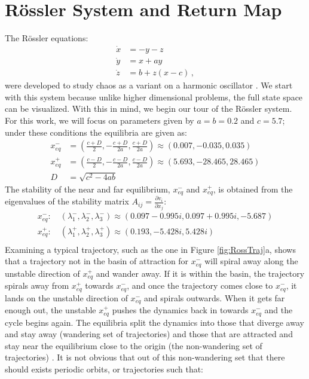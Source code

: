 \documentclass[12 pt]{article}
\begin{document}
\section{R\"ossler System and Return Map}
\label{sec:Ross}
The R\"ossler equations:
\begin{equation}
\begin{split}
  \dot x &= -y -z \\
  \dot y &= x + a y \\
  \dot z &= b + z (x - c) \,,
  \label{eq:Rossler}
\end{split}
\end{equation}
were developed to study chaos as a variant on a harmonic oscillator \cite{CB}.  We start with this system because unlike higher dimensional problems, the full state space can be visualized.  With this in mind, we begin our tour of the R\"ossler system.
For this work, we will focus on parameters given by $a = b = 0.2$ and $c = 5.7$; under these conditions the equilibria are given as:
\begin{equation}
\begin{split}
x_{eq}^{-} &= (\frac{c+D}{2}, -\frac{c+D}{2a}, \frac{c+D}{2a}) \approx (0.007,-0.035,0.035)\\
x_{eq}^{+} &= (\frac{c-D}{2}, -\frac{c-D}{2a}, \frac{c-D}{2a}) \approx (5.693,-28.465,28.465) \\
D &= \sqrt{c^2-4ab}
\end{split}
\label{eq:RossEq}
\end{equation}
The stability of the near and far equilibrium, $x_{eq}^{-}$ and $x_{eq}^{+}$, is obtained from the eigenvalues of the stability matrix $A_{ij} = \frac{\partial{v_{i}}}{\partial{x_{j}}}$:
\begin{equation}
\begin{split}
x_{eq}^{-} : \quad (\lambda_1^-, \lambda_2^-, \lambda_3^-) \approx (0.097-0.995i, 0.097+0.995i, -5.687) \\
x_{eq}^{+} : \quad (\lambda_1^+, \lambda_2^+, \lambda_3^+) \approx (0.193, -5.428i, 5.428i) \\
\end{split}
\label{eq:RossStab}
\end{equation}
Examining a typical trajectory, such as the one in Figure \ref{fig:RossTraj}a, shows that a trajectory not in the basin of attraction for $x_{eq}^{-}$ will spiral away along the unstable direction of $x_{eq}^{+}$ and wander away.  If it is within the basin, the trajectory spirals away from $x_{eq}^{+}$ towards $x_{eq}^{-}$, and once the trajectory comes close to $x_{eq}^{-}$, it lands on the unstable direction of $x_{eq}^{-}$ and spirals outwards.  When it gets far enough out, the unstable $x_{eq}^{+}$ pushes the dynamics back in towards $x_{eq}^{-}$ and the cycle begins again.  The equilibria split the dynamics into those that diverge away and stay away (wandering set of trajectories) and those that are attracted and stay near the equilibrium close to the origin (the non-wandering set of trajectories) \cite{CB}.  It is not obvious that out of this non-wandering set that there should exists periodic orbits, or trajectories such that:
\end{document}
